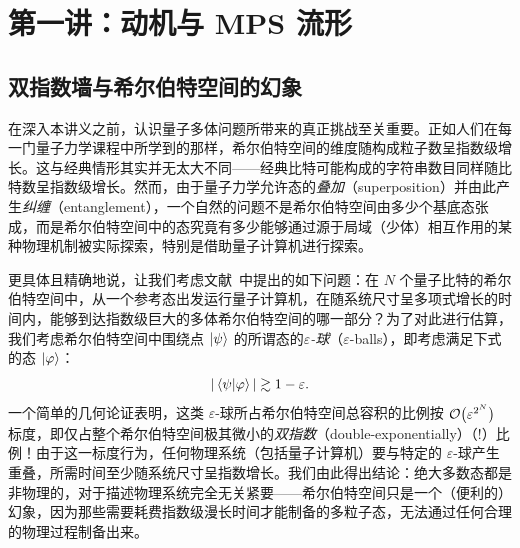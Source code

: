 \section{第一讲：动机与 MPS 流形}
\subsection{双指数墙与希尔伯特空间的幻象}\label{sec:Illusion}
在深入本讲义之前，认识量子多体问题所带来的真正挑战至关重要。正如人们在每一门量子力学课程中所学到的那样，希尔伯特空间的维度随构成粒子数呈指数级增长。这与经典情形其实并无太大不同——经典比特可能构成的字符串数目同样随比特数呈指数级增长。然而，由于量子力学允许态的\emph{叠加}（superposition）并由此产生\emph{纠缠}（entanglement），一个自然的问题不是希尔伯特空间由多少个基底态张成，而是希尔伯特空间中的态究竟有多少能够通过源于局域（少体）相互作用的某种物理机制被实际探索，特别是借助量子计算机进行探索。

更具体且精确地说，让我们考虑文献~\cite{Poulin2011}中提出的如下问题：在 $N$ 个量子比特的希尔伯特空间中，从一个参考态出发运行量子计算机，在随系统尺寸呈多项式增长的时间内，能够到达指数级巨大的多体希尔伯特空间的哪一部分？为了对此进行估算，我们考虑希尔伯特空间中围绕点 $\ket{\psi}$ 的所谓态的\emph{$\varepsilon$-球}（$\varepsilon$-balls），即考虑满足下式的态 $\ket{\varphi}$：
\begin{equation}
    \vert\braket{\psi}{\varphi}\vert \gtrsim 1 - \varepsilon.
\end{equation}
一个简单的几何论证表明，这类 $\varepsilon$-球所占希尔伯特空间总容积的比例按 $\mathcal O\big(\varepsilon^{2^N}\big)$ 标度，即仅占整个希尔伯特空间极其微小的\emph{双指数}（double-exponentially）（!）比例！由于这一标度行为，任何物理系统（包括量子计算机）要与特定的 $\varepsilon$-球产生重叠，所需时间至少随系统尺寸呈指数增长。我们由此得出结论：绝大多数态都是非物理的，对于描述物理系统完全无关紧要——希尔伯特空间只是一个（便利的）幻象，因为那些需要耗费指数级漫长时间才能制备的多粒子态，无法通过任何合理的物理过程制备出来。

